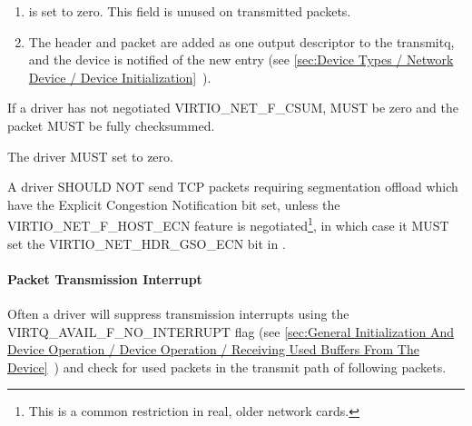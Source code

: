 \begin{enumerate}
\begin{itemize}
  \item {} is the maximum size of each packet beyond that
    header (ie. MSS).

  \item If the driver negotiated the VIRTIO_NET_F_HOST_ECN feature,
    the VIRTIO_NET_HDR_GSO_ECN bit in 
    indicates that the TCP packet has the ECN bit set\footnote{This case is not handled by some older hardware, so is called out
specifically in the protocol.}.
   \end{itemize}

\item {} is set to zero.  This field is unused on transmitted packets.

\item The header and packet are added as one output descriptor to the
  transmitq, and the device is notified of the new entry
  (see \ref{sec:Device Types / Network Device / Device Initialization}~).
\end{enumerate}


If a driver has not negotiated VIRTIO_NET_F_CSUM,  MUST be zero and
the packet MUST be fully checksummed.

The driver MUST set  to zero.

A driver SHOULD NOT send TCP packets requiring segmentation offload which have the Explicit Congestion Notification bit set, unless the VIRTIO_NET_F_HOST_ECN feature is
negotiated\footnote{This is a common restriction in real, older network cards.}, in
which case it MUST set the VIRTIO_NET_HDR_GSO_ECN bit in .

\paragraph{Packet Transmission Interrupt}\label{sec:Device Types / Network Device / Device Operation / Packet Transmission / Packet Transmission Interrupt}

Often a driver will suppress transmission interrupts using the
VIRTQ_AVAIL_F_NO_INTERRUPT flag
 (see \ref{sec:General Initialization And Device Operation / Device Operation / Receiving Used Buffers From The Device}~)
and check for used packets in the transmit path of following
packets.

